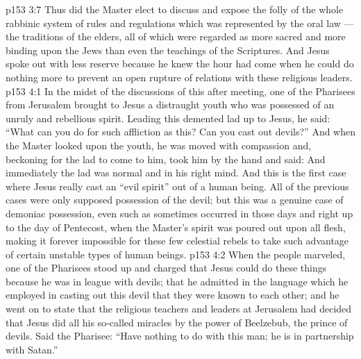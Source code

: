 \vs p153 3:7 Thus did the Master elect to discuss and expose the folly of the whole rabbinic system of rules and regulations which was represented by the oral law --- the traditions of the elders, all of which were regarded as more sacred and more binding upon the Jews than even the teachings of the Scriptures. And Jesus spoke out with less reserve because he knew the hour had come when he could do nothing more to prevent an open rupture of relations with these religious leaders.
\vs p153 4:1 In the midst of the discussions of this after meeting, one of the Pharisees from Jerusalem brought to Jesus a distraught youth who was possessed of an unruly and rebellious spirit. Leading this demented lad up to Jesus, he said: “What can you do for such affliction as this? Can you cast out devils?” And when the Master looked upon the youth, he was moved with compassion and, beckoning for the lad to come to him, took him by the hand and said:  And immediately the lad was normal and in his right mind. And this is the first case where Jesus really cast an “evil spirit” out of a human being. All of the previous cases were only supposed possession of the devil; but this was a genuine case of demoniac possession, even such as sometimes occurred in those days and right up to the day of Pentecost, when the Master’s spirit was poured out upon all flesh, making it forever impossible for these few celestial rebels to take such advantage of certain unstable types of human beings.
\vs p153 4:2 When the people marveled, one of the Pharisees stood up and charged that Jesus could do these things because he was in league with devils; that he admitted in the language which he employed in casting out this devil that they were known to each other; and he went on to state that the religious teachers and leaders at Jerusalem had decided that Jesus did all his so\hyp{}called miracles by the power of Beelzebub, the prince of devils. Said the Pharisee: “Have nothing to do with this man; he is in partnership with Satan.”
